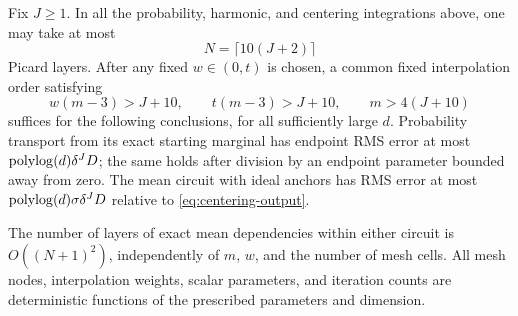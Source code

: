 \begin{corollary}
\label{prop:exact-mean-circuits}
Fix $J\ge1$.  In all the probability, harmonic, and centering
integrations above, one may take at most
\[
 N=\lceil10(J+2)\rceil
\]
Picard layers.  After any fixed $w\in(0,t)$ is chosen, a common fixed
interpolation order satisfying
\begin{equation}\label{eq:interpolation-order-choice}
 w(m-3)>J+10,\qquad t(m-3)>J+10,\qquad m>4(J+10)
\end{equation}
suffices for the following conclusions, for all sufficiently large $d$.
Probability transport from its exact starting marginal has endpoint RMS
error at most $\operatorname{polylog}(d)\delta^JD$; the same holds after division by
an endpoint parameter bounded away from zero.  The mean circuit with
ideal anchors has RMS error at most $\operatorname{polylog}(d)\sigma\delta^JD$
relative to \eqref{eq:centering-output}.

The number of layers of exact mean dependencies within either circuit
is $O((N+1)^2)$, independently of $m$, $w$, and the number of mesh cells.
All mesh nodes, interpolation weights, scalar parameters, and iteration
counts are deterministic functions of the prescribed parameters and
dimension.
\end{corollary}

